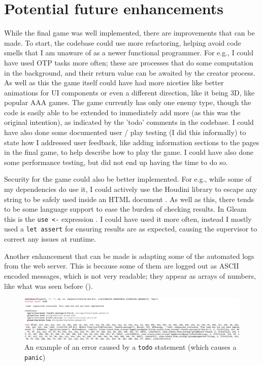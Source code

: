 \documentclass[]{final}
\begin{document}
\newpage

\section{Potential future enhancements}

While the final game was well implemented, there are improvements that can be
made. To start, the codebase could use more refactoring, helping avoid code
smells that I am unaware of as a newer functional programmer. For e.g., I could have
used OTP tasks more often; these are processes that do some computation in
the background, and their return value can be awaited by the creator process.
As well as this the game itself could have had more niceties like better
animations for UI components or even a different direction, like it being 3D,
like popular AAA games. The game currently has only one enemy type, though
the code is easily able to be extended to immediately add more (as this was the original intention), as indicated by the 'todo'
comments in the codebase. I could have also done some documented user / play
testing (I did this informally) to state how I addressed user feedback,
like adding information sections to the pages in the final game, to
help describe how to play the game. I could have also done some performance
testing, but did not end up having the time to do so.

Security for the game could also be better implemented.
For e.g., while some of my dependencies do use it, I could actively use the
Houdini library to escape any string to be safely used inside an HTML document \cite{noauthor_houdini_nodate}.
As well as this,
there tends to be
some language support to ease the burden of checking results. In
Gleam this is the \lstinline|use <-| expression \cite{olano_gleam_2025}.
I could have used it more often, instead I mostly used a \lstinline|let assert|
for ensuring results are as expected, causing the supervisor to correct any
issues at runtime.

Another enhancement that can be made is adapting some of the automated logs
from the web server. This is because some of them are logged out as ASCII
encoded messages, which is not very readable; they appear as arrays of
numbers, like what was seen before {\hypersetup{linkcolor=teal}(\pageref{ascii})}.

\begin{figure}[H]
  \includegraphics[width=\linewidth]{todo_ascii_err.png}
  \caption{An example of an error caused by a \lstinline|todo| statement (which causes a \lstinline|panic|)}
\end{figure}
\end{document}

